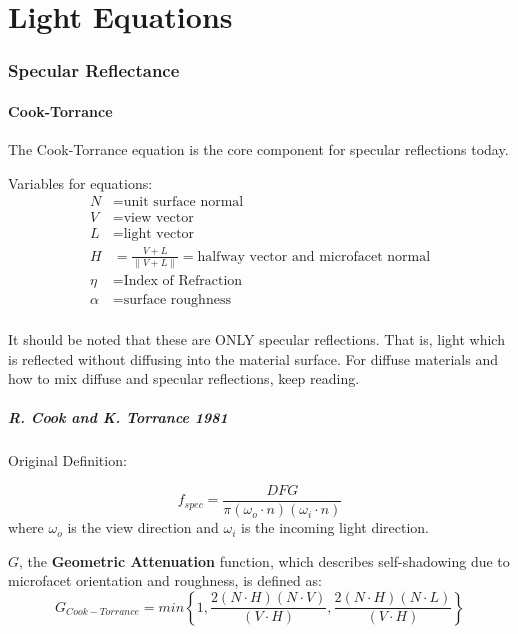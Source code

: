 \documentclass[12pt,letterpaper]{article}
\begin{document}
\newpage

\part{Light Equations}

\section{Specular Reflectance}

\subsection{Cook-Torrance}

The Cook-Torrance equation is the core component for specular reflections today.

Variables for equations:
\begin{align*}
N &= \text{unit surface normal}\\
V &= \text{view vector}\\
L &= \text{light vector}\\
H &= \frac{V + L}{\lVert V + L \rVert} = \text{halfway vector and microfacet normal}\\
\eta &= \text{Index of Refraction}\\
\alpha &= \text{surface roughness}\\
\end{align*}

It should be noted that these are ONLY specular reflections. That is, light which is reflected without diffusing into the material surface.
For diffuse materials and how to mix diffuse and specular reflections, keep reading.

\newpage

\subsubsection{R. Cook and K. Torrance 1981}

Original Definition:

$$
f_{spec} = \frac{D F G}{\pi \left( \omega_o \cdot n \right) \left( \omega_i \cdot n \right) }
$$
where $\omega_o$ is the view direction and $\omega_i$ is the incoming light direction.

$G$, the \textbf{Geometric Attenuation} function, which describes self-shadowing due to microfacet orientation and roughness, is defined as:
$$
G_{Cook-Torrance} = min \left\lbrace1, 
              \frac{2 \left( N \cdot H \right) \left( N \cdot V \right)}{\left( V \cdot H \right)}, 
              \frac{2 \left( N \cdot H \right) \left( N \cdot L \right)}{\left( V \cdot H \right)}
        \right\rbrace
$$
\end{document}
